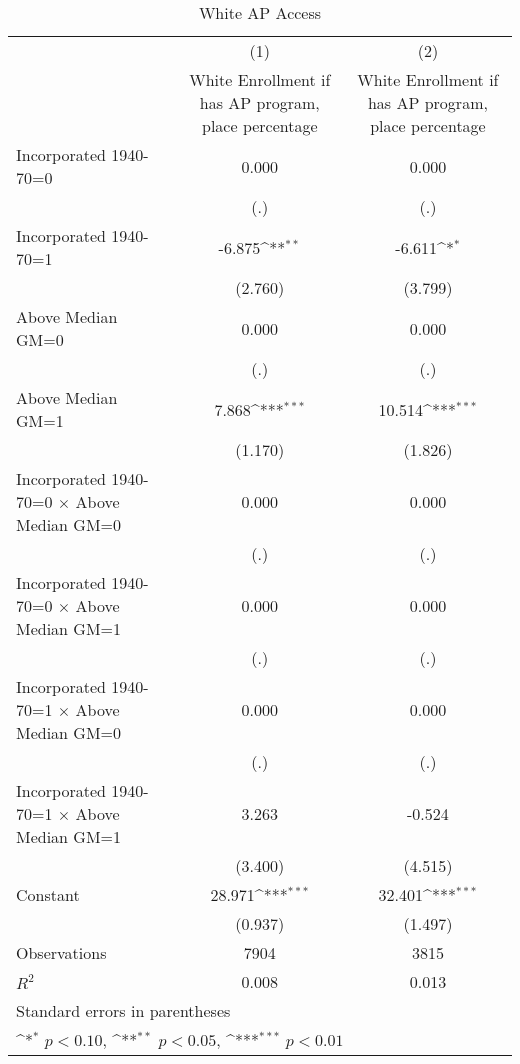 \begin{table}[htbp]\centering
\def\sym#1{\ifmmode^{#1}\else\(^{#1}\)\fi}
\caption{White AP Access}
\begin{tabular}{l*{2}{c}}
\hline\hline
                    &\multicolumn{1}{c}{(1)}&\multicolumn{1}{c}{(2)}\\
                    &\multicolumn{1}{c}{White Enrollment if has AP program, place percentage}&\multicolumn{1}{c}{White Enrollment if has AP program, place percentage}\\
\hline
Incorporated 1940-70=0&       0.000         &       0.000         \\
                    &         (.)         &         (.)         \\
[1em]
Incorporated 1940-70=1&      -6.875\sym{**} &      -6.611\sym{*}  \\
                    &     (2.760)         &     (3.799)         \\
[1em]
Above Median GM=0   &       0.000         &       0.000         \\
                    &         (.)         &         (.)         \\
[1em]
Above Median GM=1   &       7.868\sym{***}&      10.514\sym{***}\\
                    &     (1.170)         &     (1.826)         \\
[1em]
Incorporated 1940-70=0 $\times$ Above Median GM=0&       0.000         &       0.000         \\
                    &         (.)         &         (.)         \\
[1em]
Incorporated 1940-70=0 $\times$ Above Median GM=1&       0.000         &       0.000         \\
                    &         (.)         &         (.)         \\
[1em]
Incorporated 1940-70=1 $\times$ Above Median GM=0&       0.000         &       0.000         \\
                    &         (.)         &         (.)         \\
[1em]
Incorporated 1940-70=1 $\times$ Above Median GM=1&       3.263         &      -0.524         \\
                    &     (3.400)         &     (4.515)         \\
[1em]
Constant            &      28.971\sym{***}&      32.401\sym{***}\\
                    &     (0.937)         &     (1.497)         \\
\hline
Observations        &        7904         &        3815         \\
\(R^{2}\)           &       0.008         &       0.013         \\
\hline\hline
\multicolumn{3}{l}{\footnotesize Standard errors in parentheses}\\
\multicolumn{3}{l}{\footnotesize \sym{*} \(p<0.10\), \sym{**} \(p<0.05\), \sym{***} \(p<0.01\)}\\
\end{tabular}
\end{table}
